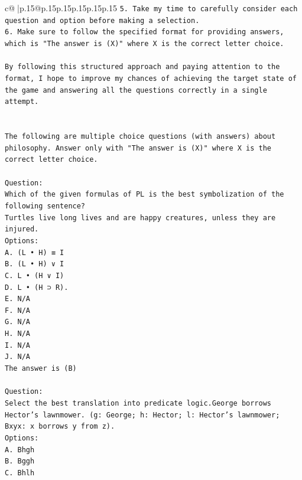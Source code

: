 \documentclass{article}
\begin{document}
{\begin{supertabular}{c@{$\;$}|p{.15\linewidth}@{}p{.15\linewidth}p{.15\linewidth}p{.15\linewidth}p{.15\linewidth}p{.15\linewidth}}
{{{\texttt{5. Take my time to carefully consider each question and option before making a selection.} \\
\texttt{6. Make sure to follow the specified format for providing answers, which is "The answer is (X)" where X is the correct letter choice.} \\
\\ 
\texttt{By following this structured approach and paying attention to the format, I hope to improve my chances of achieving the target state of the game and answering all the questions correctly in a single attempt.} \\
\\ 
\\ 
\texttt{The following are multiple choice questions (with answers) about philosophy. Answer only with "The answer is (X)" where X is the correct letter choice.} \\
\\ 
\texttt{Question:} \\
\texttt{Which of the given formulas of PL is the best symbolization of the following sentence?} \\
\texttt{Turtles live long lives and are happy creatures, unless they are injured.} \\
\texttt{Options:} \\
\texttt{A. (L • H) ≡ I} \\
\texttt{B. (L • H) ∨ I} \\
\texttt{C. L • (H ∨ I)} \\
\texttt{D. L • (H ⊃ R).} \\
\texttt{E. N/A} \\
\texttt{F. N/A} \\
\texttt{G. N/A} \\
\texttt{H. N/A} \\
\texttt{I. N/A} \\
\texttt{J. N/A} \\
\texttt{The answer is (B)} \\
\\ 
\texttt{Question:} \\
\texttt{Select the best translation into predicate logic.George borrows Hector's lawnmower. (g: George; h: Hector; l: Hector's lawnmower; Bxyx: x borrows y from z).} \\
\texttt{Options:} \\
\texttt{A. Bhgh} \\
\texttt{B. Bggh} \\
\texttt{C. Bhlh} \\
}}}
\end{supertabular}}
\end{document}
